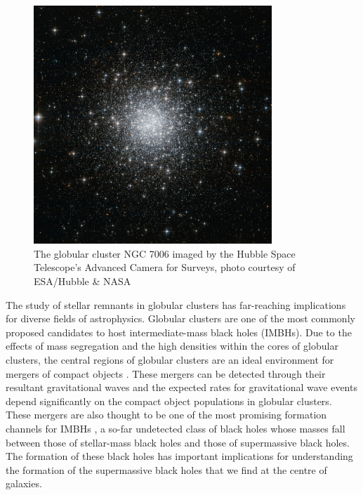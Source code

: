 \begin{figure}
	\centering
	\includegraphics[width=0.8\textwidth]{figures/c42.jpg}
	\caption{The globular cluster NGC 7006 imaged by the Hubble Space Telescope's Advanced
		Camera for Surveys, photo courtesy of ESA/Hubble \& NASA}
	\label{fig:1/ngc7006}
\end{figure}



The study of stellar remnants in globular clusters has far-reaching implications for diverse fields
of astrophysics. Globular clusters are one of the most commonly proposed candidates to host
intermediate-mass black holes (IMBHs). Due to the effects of mass segregation and the high densities
within the cores of globular clusters, the central regions of globular clusters are an ideal
environment for mergers of compact objects \citep{Rodriguez2021}. These mergers can be detected
through their resultant gravitational waves and the expected rates for gravitational wave events
depend significantly on the compact object populations in globular clusters. These mergers are also
thought to be one of the most promising formation channels for IMBHs \citep{Giersz2015}, a so-far
undetected class of black holes whose masses fall between those of stellar-mass black holes and
those of supermassive black holes. The formation of these black holes has important implications for
understanding the formation of the supermassive black holes that we find at the centre of galaxies.


